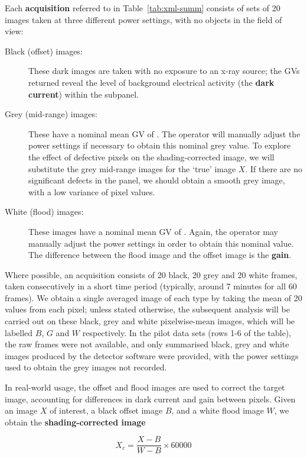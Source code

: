 \documentclass[\main/IO-Pixels.tex]{subfiles}
\begin{document}
Each \textbf{acquisition} referred to in Table~\ref{tab:xml-summ} consists of sets of 20 images taken at three different power settings, with no objects in the field of view:
\begin{description}

\item[Black (offset) images:] These dark images are taken with no exposure to an x-ray source; the GVs returned reveal the level of background electrical activity (the \textbf{dark current}) within the subpanel.
\item[Grey (mid-range) images:] These have a nominal mean GV of . The operator will manually adjust the power settings if necessary to obtain this nominal grey value. To explore the effect of defective pixels on the shading-corrected image, we will substitute the grey mid-range images for the `true' image $X$. If there are no significant defects in the panel, we should obtain a smooth grey image, with a low variance of pixel values.
\item[White (flood) images:] These images have a nominal mean GV of . Again, the operator may manually adjust the power settings in order to obtain this nominal value. The difference between the flood image and the offset image is the \textbf{gain}.
\end{description}

Where possible, an acquisition consists of 20 black, 20 grey and 20 white frames, taken consecutively in a short time period (typically, around 7 minutes for all 60 frames). We obtain a single averaged image of each type by taking the mean of 20 values from each pixel; unless stated otherwise, the subsequent analysis will be carried out on these black, grey and white pixelwise-mean images, which will be labelled $B$, $G$ and $W$ respectively. In the pilot data sets (rows 1-6 of the table), the raw frames were not available, and only summarised black, grey and white images produced by the detector software were provided, with the power settings used to obtain the grey images not recorded.

In real-world usage, the offset and flood images are used to correct the target image, accounting for differences in dark current and gain between pixels. Given an image $X$ of interest, a black offset image $B$, and a white flood image $W$, we obtain the \textbf{shading-corrected image}

\begin{equation}
\label{eq:shading-correction}
	X_c = \frac{X -B}{W - B} \times 60000
\end{equation}
\end{document}
